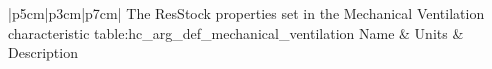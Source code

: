 \begin{customLongTable}{ |p{5cm}|p{3cm}|p{7cm}| }
{The ResStock properties set in the Mechanical Ventilation characteristic} {table:hc_arg_def_mechanical_ventilation}
{Name & Units & Description}
\end{customLongTable}
